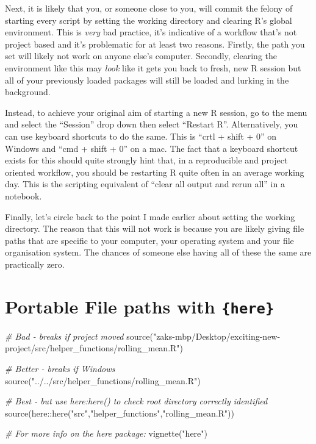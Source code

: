 \documentclass[
  12pt,
]{book}
\newenvironment{Shaded}{\begin{snugshade}}{\end{snugshade}}
\newcommand{\CommentTok}[1]{\textcolor[rgb]{0.56,0.35,0.01}{\textit{#1}}}
\newcommand{\FunctionTok}[1]{\textcolor[rgb]{0.00,0.00,0.00}{#1}}
\newcommand{\NormalTok}[1]{#1}
\newcommand{\SpecialCharTok}[1]{\textcolor[rgb]{0.00,0.00,0.00}{#1}}
\newcommand{\StringTok}[1]{\textcolor[rgb]{0.31,0.60,0.02}{#1}}
\begin{document}
Next, it is likely that you, or someone close to you, will commit the felony of starting every script by setting the working directory and clearing R's global environment. This is \emph{very} bad practice, it's indicative of a workflow that's not project based and it's problematic for at least two reasons. Firstly, the path you set will likely not work on anyone else's computer. Secondly, clearing the environment like this may \emph{look} like it gets you back to fresh, new R session but all of your previously loaded packages will still be loaded and lurking in the background.

Instead, to achieve your original aim of starting a new R session, go to the menu and select the ``Session'' drop down then select ``Restart R''. Alternatively, you can use keyboard shortcuts to do the same. This is ``crtl + shift + 0'' on Windows and ``cmd + shift + 0'' on a mac. The fact that a keyboard shortcut exists for this should quite strongly hint that, in a reproducible and project oriented workflow, you should be restarting R quite often in an average working day. This is the scripting equivalent of ``clear all output and rerun all'' in a notebook.

Finally, let's circle back to the point I made earlier about setting the working directory. The reason that this will not work is because you are likely giving file paths that are specific to your computer, your operating system and your file organisation system. The chances of someone else having all of these the same are practically zero.

\hypertarget{portable-file-paths-with-here}{%
\section{\texorpdfstring{Portable File paths with \texttt{\{here\}}}{Portable File paths with \{here\}}}\label{portable-file-paths-with-here}}

\begin{Shaded}
\begin{Highlighting}[]
\CommentTok{\# Bad {-} breaks if project moved}
\FunctionTok{source}\NormalTok{(}\StringTok{"zaks{-}mbp/Desktop/exciting{-}new{-}project/src/helper\_functions/rolling\_mean.R"}\NormalTok{)}

\CommentTok{\# Better {-} breaks if Windows}
\FunctionTok{source}\NormalTok{(}\StringTok{"../../src/helper\_functions/rolling\_mean.R"}\NormalTok{)}

\CommentTok{\# Best {-} but use here:here() to check root directory correctly identified}
\FunctionTok{source}\NormalTok{(here}\SpecialCharTok{::}\FunctionTok{here}\NormalTok{(}\StringTok{"src"}\NormalTok{,}\StringTok{"helper\_functions"}\NormalTok{,}\StringTok{"rolling\_mean.R"}\NormalTok{))}

\CommentTok{\# For more info on the here package:}
\FunctionTok{vignette}\NormalTok{(}\StringTok{"here"}\NormalTok{)}
\end{Highlighting}
\end{Shaded}
\end{document}
